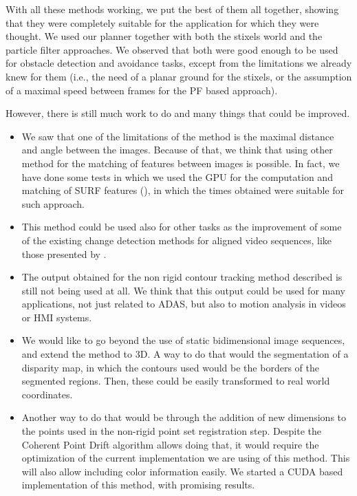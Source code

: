 With all these methods working, we put the best of them all together, showing that they were completely suitable for the application for which they were thought. We used our planner together with both the stixels world and the particle filter approaches. We observed that both were good enough to be used for obstacle detection and avoidance tasks, except from the limitations we already knew for them (i.e., the need of a planar ground for the stixels, or the assumption of a maximal speed between frames for the \ac{PF} based approach).


However, there is still much work to do and many things that could be improved. 

\begin{itemize}
 \item We saw that one of the limitations of the method is the maximal distance and angle between the images. Because of that, we think that using other method for the matching of features between images is possible. In fact, we have done some tests in which we used the \ac{GPU} for the computation and matching of \ac{SURF} features (\cite{bay2008speeded}), in which the times obtained were suitable for such approach.
 \item This method could be used also for other tasks as the improvement of some of the existing change detection methods for aligned video sequences, like those presented by \cite{diego2011video, evangelidis2011slice, evangelidis2011efficient}.
 \item The output obtained for the non rigid contour tracking method described is still not being used at all. We think that this output could be used for many applications, not just related to \ac{ADAS}, but also to motion analysis in videos or \ac{HMI} systems.
 \item We would like to go beyond the use of static bidimensional image sequences, and extend the method to 3D. A way to do that would the segmentation of a disparity map, in which the contours used would be the borders of the segmented regions. Then, these could be easily transformed to real world coordinates.
 \item Another way to do that would be through the addition of new dimensions to the points used in the non-rigid point set registration step. Despite the Coherent Point Drift algorithm allows doing that, it would require the optimization of the current implementation we are using of this method. This will also allow including color information easily. We started a \ac{CUDA} based implementation of this method, with promising results.

\end{itemize}
